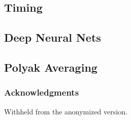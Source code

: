 \documentclass{article} %
\begin{document}
\subsection{Timing}


\subsection{Deep Neural Nets}

\subsection{Polyak Averaging}
\citep{polyak_methods_1964}


\subsubsection*{Acknowledgments}

Withheld from the anonymized version.

\printbibliography 


\end{document}
